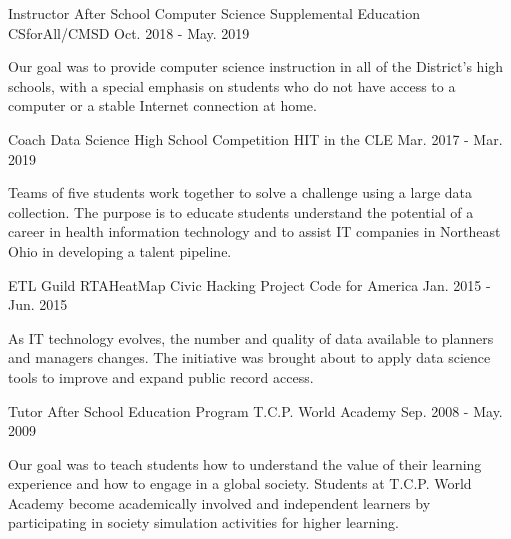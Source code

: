 
\begin{cventries}
  \cventry
    {Instructor} %
    {After School Computer Science Supplemental Education} %
    {CSforAll/CMSD} %
    {Oct. 2018 - May. 2019} %
    {
      \begin{cvcompactparagraph}
        Our goal was to provide computer science instruction in all of the District's high schools, with a special emphasis on students who do not have access to a computer or a stable Internet connection at home.
      \end{cvcompactparagraph}
    }
  \cventry
    {Coach} %
    {Data Science High School Competition} %
    {HIT in the CLE} %
    {Mar. 2017 - Mar. 2019} %
    {
      \begin{cvcompactparagraph}
        Teams of five students work together to solve a challenge using a large data collection. The purpose is to educate students understand the potential of a career in health information technology and to assist IT companies in Northeast Ohio in developing a talent pipeline.
      \end{cvcompactparagraph}
    }
  \cventry
    {ETL Guild} %
    {RTAHeatMap Civic Hacking Project} %
    {Code for America} %
    {Jan. 2015 - Jun. 2015} %
    {
      \begin{cvcompactparagraph}
        As IT technology evolves, the number and quality of data available to planners and managers changes. The initiative was brought about to apply data science tools to improve and expand public record access.
      \end{cvcompactparagraph}
    }
  \cventry
    {Tutor} %
    {After School Education Program} %
    {T.C.P. World Academy} %
    {Sep. 2008 - May. 2009} %
    {
      \begin{cvcompactparagraph}
        Our goal was to teach students how to understand the value of their learning experience and how to engage in a global society.  Students at T.C.P. World Academy become academically involved and independent learners by participating in society simulation activities for higher learning.
      \end{cvcompactparagraph}
    }
\end{cventries}
